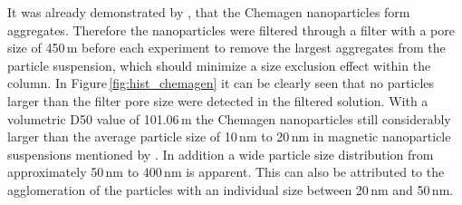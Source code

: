 It was already demonstrated by \cite{AndreMaster}, that the Chemagen nanoparticles form aggregates. Therefore the nanoparticles were filtered through a filter with a pore size of 450\,\textmu m before each experiment to remove the largest aggregates from the particle suspension, which should minimize a size exclusion effect within the column. In Figure\,\ref{fig:hist_chemagen} it can be clearly seen that no particles larger than the filter pore size were detected in the filtered solution. With a volumetric D50 value of 101.06\,\textmu m the Chemagen nanoparticles still considerably larger than the average particle size of 10\,nm to 20\,nm in magnetic nanoparticle suspensions mentioned by \cite{svoboda2004magnetic}. In addition a wide particle size distribution from approximately 50\,nm to 400\,nm is apparent. This can also be attributed to the agglomeration of the particles with an individual size between 20\,nm and 50\,nm.
